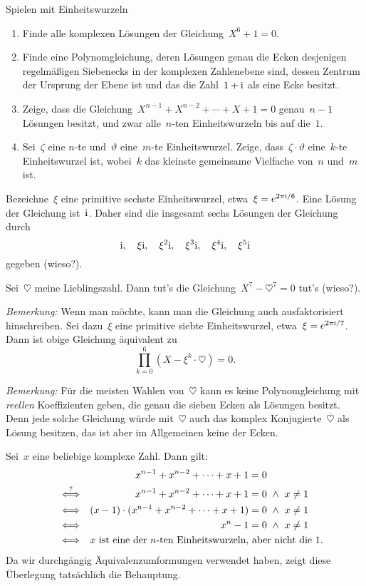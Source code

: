 \documentclass{algblatt}
\begin{document}
\ifloesungen\newpage\fi
\begin{aufgabe}{Spielen mit Einheitswurzeln}
\begin{enumerate}
\item Finde alle komplexen Lösungen der Gleichung~$X^6 + 1 = 0$.
\item Finde eine Polynomgleichung, deren Lösungen genau die Ecken
desjenigen re\-gel\-mä\-ßi\-gen Siebenecks in der komplexen Zahlenebene sind, dessen Zentrum
der Ursprung der Ebene ist und das die Zahl~$1 + \mathrm{i}$ als eine Ecke besitzt.
\item Zeige, dass die Gleichung~$X^{n-1} + X^{n-2} + \cdots + X + 1 = 0$
genau~$n-1$ Lösungen besitzt, und zwar alle~$n$-ten Einheitswurzeln bis auf
die~$1$.
\item Sei~$\zeta$ eine $n$-te und~$\vartheta$ eine~$m$-te Einheitswurzel.
Zeige, dass~$\zeta \cdot \vartheta$ eine~$k$-te Einheitswurzel ist, wobei~$k$
das kleinste gemeinsame Vielfache von~$n$ und~$m$ ist.
\end{enumerate}
\begin{loesungE}
\item Bezeichne~$\xi$ eine primitive sechste Einheitswurzel, etwa~$\xi =
e^{2\pi\mathrm{i} / 6}$. Eine Lösung der Gleichung ist~$\mathrm{i}$. Daher sind die
insgesamt sechs Lösungen der Gleichung durch
\[ \mathrm{i},\quad \xi \mathrm{i},\quad \xi^2 \mathrm{i},\quad \xi^3 \mathrm{i},\quad \xi^4 \mathrm{i},\quad \xi^5 \mathrm{i} \]
gegeben (wieso?).
\item Sei~$\heartsuit$ meine Lieblingszahl. Dann tut's die Gleichung~$X^7 -
\heartsuit^7 = 0$ tut's (wieso?).

\emph{Bemerkung:} Wenn man möchte, kann man die Gleichung auch ausfaktorisiert
hinschreiben. Sei dazu~$\xi$ eine primitive siebte Einheitswurzel, etwa~$\xi =
e^{2\pi\mathrm{i} / 7}$. Dann ist obige Gleichung äquivalent zu
\[ \prod_{k=0}^6 (X - \xi^k \cdot \heartsuit) = 0. \]

\emph{Bemerkung:} Für die meisten Wahlen von~$\heartsuit$ kann es keine
Polynomgleichung mit \emph{reellen} Koeffizienten geben, die genau die sieben
Ecken als Lösungen besitzt. Denn jede solche Gleichung würde mit~$\heartsuit$
auch das komplex Konjugierte~$\overline{\heartsuit}$ als Lösung besitzen, das
ist aber im Allgemeinen keine der Ecken.

\item Sei~$x$ eine beliebige komplexe Zahl. Dann gilt:
\begin{align*}
  && x^{n-1} + x^{n-2} + \cdots + x + 1 &= 0 \\
  \stackrel{?}{\Longleftrightarrow} &&
    x^{n-1} + x^{n-2} + \cdots + x + 1 &= 0 \ \wedge\  x \neq 1 \\
  \Longleftrightarrow &&
    (x - 1) \cdot (x^{n-1} + x^{n-2} + \cdots + x + 1) &= 0 \ \wedge\  x \neq 1 \\
  \Longleftrightarrow &&
    x^n - 1 &= 0 \ \wedge\  x \neq 1 \\
  \Longleftrightarrow &&
    \omit\rlap{\text{$x$ ist eine der~$n$-ten Einheitswurzeln, aber nicht
    die~$1$.}}
\end{align*}
Da wir durchgängig Äquivalenzumformungen verwendet haben, zeigt diese
Überlegung tatsächlich die Behauptung.


\end{loesungE}
\end{aufgabe}
\end{document}

